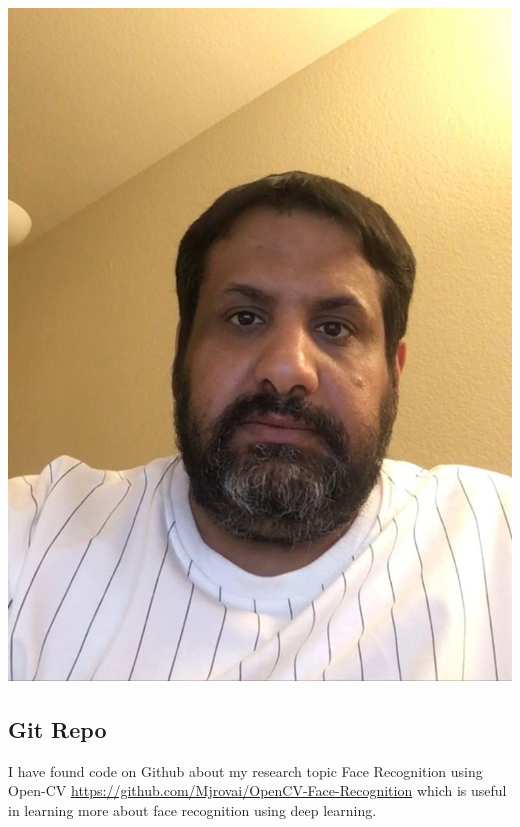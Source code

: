 \documentclass[11pt]{article}
\begin{document}
\begin{center}
\includegraphics[scale=0.2]{Khalid.jpeg}
\end{center}


 \subsection{Git Repo}
I have found code on Github about my research topic Face Recognition using Open-CV \url{https://github.com/Mjrovai/OpenCV-Face-Recognition} which is useful in learning more about face recognition using deep learning.
\end{document}

